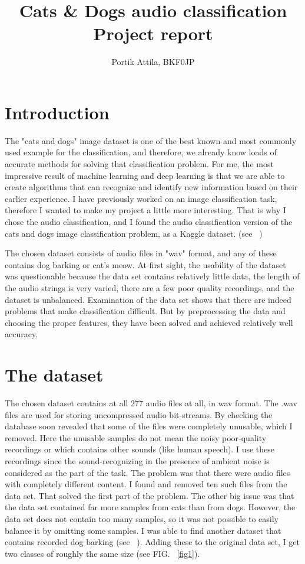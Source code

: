\documentclass[12pt a4paper]{article}
\numberwithin{equation}{section}
\begin{document}
\thispagestyle{empty}
\begin{titlepage}
\title{Cats \& Dogs audio classification \\ Project report}  
\author{Portik Attila, BKF0JP}
\end{titlepage}
\maketitle


\section{Introduction}
The "cats and dogs" image dataset is one of the best known and most commonly used example for the classification, and therefore, we already know loads of accurate methods for solving that classification problem.  For me, the most impressive result of machine learning and deep learning is that we are able to create algorithms that can recognize and identify new information based on their earlier experience. I have previously worked on an image classification task, therefore I wanted to make my project a little more interesting. That is why I chose the audio classification, and I found the audio classification version of the cats and dogs image classification problem, as a Kaggle dataset. (see ~\cite{data})


The chosen dataset consists of audio files in "wav" format, and any of these contains dog barking or cat's meow. At first sight, the usability of the dataset was questionable because the data set contains relatively little data, the length of the audio strings is very varied, there are a few poor quality recordings, and the dataset is unbalanced. Examination of the data set shows that there are indeed problems that make classification difficult. But by preprocessing the data and choosing the proper features, they have been solved and achieved relatively well accuracy. 

\section{The dataset}

The chosen dataset contains at all 277 audio files at all, in wav format. The .wav files are used for storing uncompressed audio bit-streams. By checking the database soon revealed that some of the files were completely unusable, which I removed. Here the unusable samples do not mean the noisy poor-quality recordings or which contains other sounds (like human speech). I use these recordings since the sound-recognizing in the presence of ambient noise is considered as the part of the task. The problem was that there were audio files with completely different content. I found and removed ten such files from the data set. That solved the first part of the problem. The other big issue was that the data set contained far more samples from cats than from dogs. However, the data set does not contain too many samples, so it was not possible to easily balance it by omitting some samples. I was able to find another dataset that contains recorded dog barking (see ~\cite{data2}).  Adding these to the original data set, I get two classes of roughly the same size (see FIG. ~\ref{fig1}). 
\end{document}
